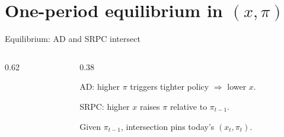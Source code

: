 \documentclass[aspectratio=169,xcolor=dvipsnames]{beamer}
\let\tempone\itemize
\let\temptwo\enditemize
\renewenvironment{itemize}{\tempone\addtolength{\itemsep}{\fill}}{\temptwo}
\newcommand{\xpiaxes}[0]{%
  \draw[axis] (-2.6,0) -- (2.8,0) node[below right] {$x_t$ (output gap)};
  \draw[axis] (0,-0.2) -- (0,4.0) node[above left] {$\pi_t$ (inflation)};
  \foreach \xx in {-2,-1,1,2} \draw (\xx,0) -- (\xx,-0.07);
  \foreach \yy in {1,2,3} \draw (0,\yy) -- (-0.07,\yy);
}
\begin{document}
\section{One-period equilibrium in $(x,\pi)$}

\begin{frame}{Equilibrium: AD and SRPC intersect}
\begin{columns}
\begin{column}{0.62\textwidth}
\centering
{}
\end{column}

\begin{column}{0.38\textwidth}
\small
\begin{itemize}
\item AD: higher $\pi$ triggers tighter policy $\Rightarrow$ lower $x$.
\item SRPC: higher $x$ raises $\pi$ relative to $\pi_{t-1}$.
\item Given $\pi_{t-1}$, intersection pins today’s $(x_t,\pi_t)$.
\end{itemize}
\end{column}
\end{columns}
\end{frame}
\end{document}
